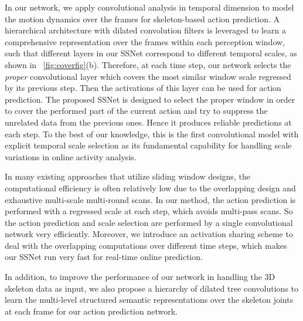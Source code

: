 \documentclass[10pt,twocolumn,letterpaper]{article}
\begin{document}
In our network, we apply convolutional analysis in temporal dimension to model the motion dynamics over the frames for skeleton-based action prediction.
A hierarchical architecture with dilated convolution filters is leveraged to learn a comprehensive representation over the frames within each perception window,
such that different layers in our SSNet correspond to different temporal scales,
as shown in \figurename{~\ref{fig:coverfig}(b)}.
Therefore, at each time step, our network selects the \emph{proper} convolutional layer which covers the most similar window scale regressed by its previous step.
Then the activations of this layer can be used for action prediction.
The proposed SSNet is designed to select the proper window in order to cover the performed part of the current action
and try to suppress the unrelated data from the previous ones.
Hence it produces reliable predictions at each step.
To the best of our knowledge,
this is the first convolutional model with explicit temporal scale selection as its fundamental capability for handling scale variations in online activity analysis.

In many existing approaches that utilize sliding window designs,
the computational efficiency is often relatively low due to the overlapping design and exhaustive multi-scale multi-round scans.
In our method, the action prediction is performed with a regressed scale at each step, which avoids multi-pass scans.
So the action prediction and scale selection are performed by a single convolutional network very efficiently.
Moreover, we introduce an activation sharing scheme to deal with the overlapping computations over different time steps,
which makes our SSNet run very fast for real-time online prediction.

In addition, to improve the performance of our network in handling the 3D skeleton data as input,
we also propose a hierarchy of dilated tree convolutions to learn the multi-level structured semantic representations over the skeleton joints at each frame for our action prediction network.
\end{document}

